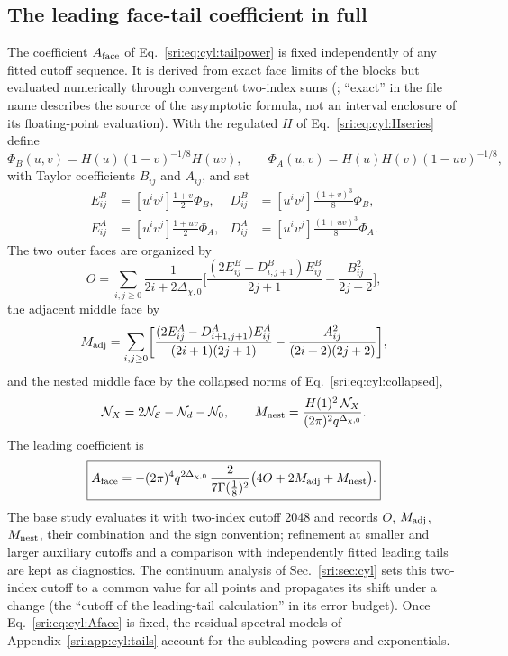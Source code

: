 \subsection{The leading face-tail coefficient in full}\label{sri:app:cyl:facetail}
The coefficient $A_{\rm face}$ of Eq.~\eqref{sri:eq:cyl:tailpower} is fixed independently of any fitted cutoff sequence. It
is derived from exact face limits of the blocks but evaluated numerically through convergent two-index sums
(; ``exact'' in the file name describes the source of
the asymptotic formula, not an interval enclosure of its floating-point evaluation). With the regulated $H$ of
Eq.~\eqref{sri:eq:cyl:Hseries} define
\begin{equation}
 \Phi_B(u,v)=H(u)(1-v)^{-1/8}H(uv),\qquad \Phi_A(u,v)=H(u)H(v)(1-uv)^{-1/8},
\end{equation}
with Taylor coefficients $B_{ij}$ and $A_{ij}$, and set
\begin{equation}
\begin{aligned}
 E^B_{ij}&=[u^iv^j]\frac{1+v}{2}\Phi_B, & D^B_{ij}&=[u^iv^j]\frac{(1+v)^3}{8}\Phi_B,\\
 E^A_{ij}&=[u^iv^j]\frac{1+uv}{2}\Phi_A, & D^A_{ij}&=[u^iv^j]\frac{(1+uv)^3}{8}\Phi_A.
\end{aligned}
\end{equation}
The two outer faces are organized by
\begin{equation}
 O=\sum_{i,j\ge0}\frac1{2i+2\Delta_{\chi,0}}\biggl[\frac{(2E^B_{ij}-D^B_{i,j+1})E^B_{ij}}{2j+1}-\frac{B_{ij}^2}{2j+2}\biggr],
\end{equation}
the adjacent middle face by
\begin{equation}
 M_{\rm adj}=\sum_{i,j\ge0}\biggl[\frac{(2E^A_{ij}-D^A_{i+1,j+1})E^A_{ij}}{(2i+1)(2j+1)}-\frac{A_{ij}^2}{(2i+2)(2j+2)}\biggr],
\end{equation}
and the nested middle face by the collapsed norms of Eq.~\eqref{sri:eq:cyl:collapsed},
\begin{equation}
 \mathcal N_X=2\mathcal N_{\mathcal E}-\mathcal N_d-\mathcal N_0,\qquad
 M_{\rm nest}=\frac{H(1)^2\,\mathcal N_X}{(2\pi)^2q^{\Delta_{\chi,0}}}.
\end{equation}
The leading coefficient is
\begin{equation}
 \boxed{A_{\rm face}=-(2\pi)^4q^{2\Delta_{\chi,0}}\,\frac{2}{7\Gamma(\frac18)^2}\bigl(4O+2M_{\rm adj}+M_{\rm nest}\bigr).}
 \label{sri:eq:cyl:Aface}
\end{equation}
The base study evaluates it with two-index cutoff 2048 and records $O$, $M_{\rm adj}$, $M_{\rm nest}$, their
combination and the sign convention; refinement at smaller and larger auxiliary cutoffs and a comparison with
independently fitted leading tails are kept as diagnostics. The continuum analysis of Sec.~\ref{sri:sec:cyl} sets this
two-index cutoff to a common value for all points and propagates its shift under a change (the ``cutoff of the
leading-tail calculation'' in its error budget). Once Eq.~\eqref{sri:eq:cyl:Aface} is fixed, the residual spectral models of Appendix~\ref{sri:app:cyl:tails} account for
the subleading powers and exponentials.


